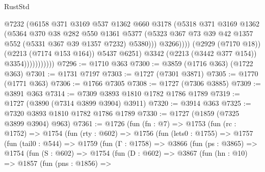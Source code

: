 \begin{lexlean}{RustStd}
\begin{coremodule}
                                  @7232
                                  (@6158
                                    @371
                                    @3169
                                    @537
                                    @1362
                                    @660
                                    @3178
                                    (@5318
                                      @371
                                      @3169
                                      @1362
                                      (@5364
                                        @370
                                        @38
                                        @282
                                        @550
                                        @1361
                                        @5377
                                        (@5323
                                          @367
                                          @73
                                          @39
                                          @42
                                          @1357
                                          @552
                                          (@5331 @367 @39 @1357 @7232)
                                          @5380)))
                                    @3266))))
                            (@2929 (@7170 @18))
                            (@2213 (@7174 @153 @164))
                            @5437
                            @6251)
                          @3342
                          (@2213 (@3442 @377 @154))
                          @3354)))))))))))
@7296 := @1710 @363
@7300 := @3859 (@1716 @363) (@1722 @363)
@7301 := @1731 @7197
@7303 := @1727 (@7301 @3871)
@7305 := @1770 (@1771 @363)
@7306 := @1766 @7305
@7308 := @1727 (@7306 @3885)
@7309 := @3891 @363
@7314 := @7309 @3893 @1810 @1782 @1786 @1789
@7319 := @1727 (@3890 (@7314 @3899 @3904) @3911)
@7320 := @3914 @363
@7325 := @7320 @3893 @1810 @1782 @1786 @1789
@7330 := @1727 (@1859 (@7325 @3899 @3904) @963)
@7361 := @1726
    (fun (fn : @7) =>
    @1753
      (fun (rc : @1752) =>
      @1754
        (fun (rty : @602) =>
        @1756
          (fun (lets0 : @1755) =>
          @1757
            (fun (tail0 : @544) =>
            @1759
              (fun (Γ : @1758) =>
              @3866
                (fun (ps : @3865) =>
                @1754
                  (fun (S : @602) =>
                  @1754
                    (fun (D : @602) =>
                    @3867
                      (fun (hn : @10) =>
                      @1857
                        (fun (pns : @1856) =>

\end{coremodule}
\end{lexlean}
